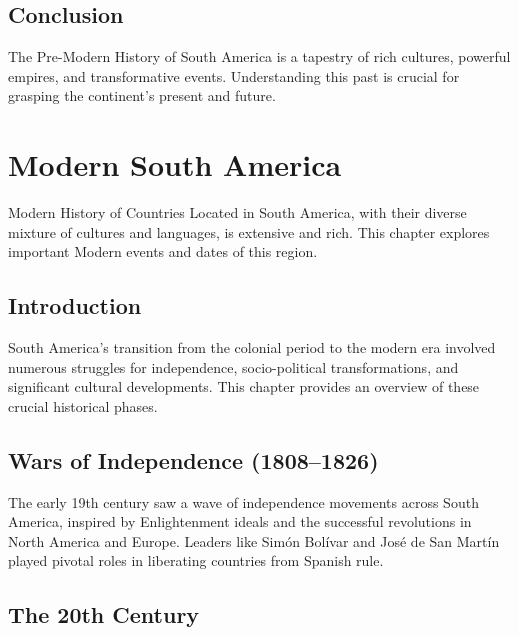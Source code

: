 \documentclass[a4paper,12pt]{book}
\begin{document}
\section{Conclusion}
\label{sec:conclusion-pre-modern-south-america}
The Pre-Modern History of South America is a tapestry of rich cultures, powerful empires, and transformative events. Understanding this past is crucial for grasping the continent’s present and future.

\chapter{Modern South America}
\label{ch:modern-history-south-america}

Modern History of Countries Located in South America, with their diverse mixture of cultures and languages, is extensive and rich. This chapter explores important Modern events and dates of this region.

\section{Introduction}
\label{sec:introduction-modern-south-america}
South America's transition from the colonial period to the modern era involved numerous struggles for independence, socio-political transformations, and significant cultural developments. This chapter provides an overview of these crucial historical phases.

\section{Wars of Independence (1808–1826)}
\label{sec:wars-of-independence}
The early 19th century saw a wave of independence movements across South America, inspired by Enlightenment ideals and the successful revolutions in North America and Europe. Leaders like Simón Bolívar and José de San Martín played pivotal roles in liberating countries from Spanish rule.

\section{The 20th Century}
\label{sec:20th-century}
\end{document}
